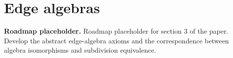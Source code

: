 \chapter{Edge algebras}

\noindent\textbf{Roadmap placeholder.}
Roadmap placeholder for section 3 of the paper. Develop the abstract
edge-algebra axioms and the correspondence between algebra isomorphisms and
subdivision equivalence.

